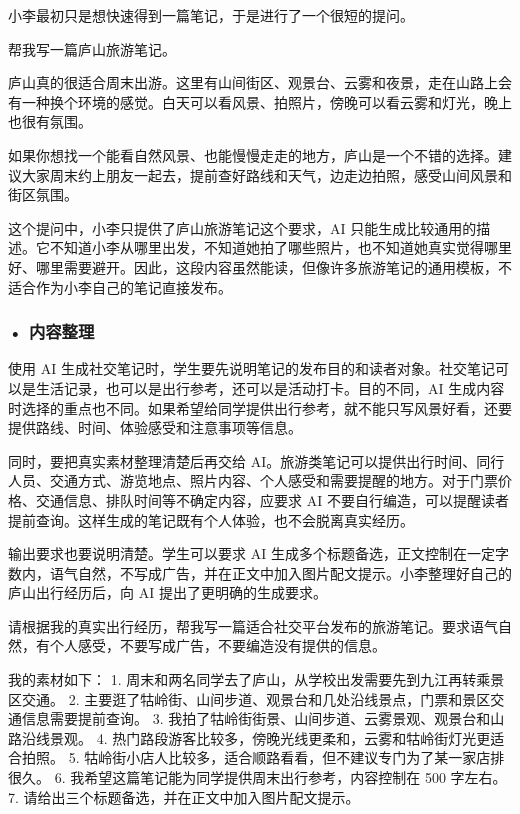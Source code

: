 小李最初只是想快速得到一篇笔记，于是进行了一个很短的提问。

\begin{userbox}
帮我写一篇庐山旅游笔记。
\end{userbox}

\begin{aibox}
庐山真的很适合周末出游。这里有山间街区、观景台、云雾和夜景，走在山路上会有一种换个环境的感觉。白天可以看风景、拍照片，傍晚可以看云雾和灯光，晚上也很有氛围。

如果你想找一个能看自然风景、也能慢慢走走的地方，庐山是一个不错的选择。建议大家周末约上朋友一起去，提前查好路线和天气，边走边拍照，感受山间风景和街区氛围。
\end{aibox}

这个提问中，小李只提供了庐山旅游笔记这个要求，AI 只能生成比较通用的描述。它不知道小李从哪里出发，不知道她拍了哪些照片，也不知道她真实觉得哪里好、哪里需要避开。因此，这段内容虽然能读，但像许多旅游笔记的通用模板，不适合作为小李自己的笔记直接发布。

\subsubsection*{\textbf{• 内容整理}}

使用 AI 生成社交笔记时，学生要先说明笔记的发布目的和读者对象。社交笔记可以是生活记录，也可以是出行参考，还可以是活动打卡。目的不同，AI 生成内容时选择的重点也不同。如果希望给同学提供出行参考，就不能只写风景好看，还要提供路线、时间、体验感受和注意事项等信息。

同时，要把真实素材整理清楚后再交给 AI。旅游类笔记可以提供出行时间、同行人员、交通方式、游览地点、照片内容、个人感受和需要提醒的地方。对于门票价格、交通信息、排队时间等不确定内容，应要求 AI 不要自行编造，可以提醒读者提前查询。这样生成的笔记既有个人体验，也不会脱离真实经历。

输出要求也要说明清楚。学生可以要求 AI 生成多个标题备选，正文控制在一定字数内，语气自然，不写成广告，并在正文中加入图片配文提示。小李整理好自己的庐山出行经历后，向 AI 提出了更明确的生成要求。


\begin{userbox}
请根据我的真实出行经历，帮我写一篇适合社交平台发布的旅游笔记。要求语气自然，有个人感受，不要写成广告，不要编造没有提供的信息。

我的素材如下：
1. 周末和两名同学去了庐山，从学校出发需要先到九江再转乘景区交通。
2. 主要逛了牯岭街、山间步道、观景台和几处沿线景点，门票和景区交通信息需要提前查询。
3. 我拍了牯岭街街景、山间步道、云雾景观、观景台和山路沿线景观。
4. 热门路段游客比较多，傍晚光线更柔和，云雾和牯岭街灯光更适合拍照。
5. 牯岭街小店人比较多，适合顺路看看，但不建议专门为了某一家店排很久。
6. 我希望这篇笔记能为同学提供周末出行参考，内容控制在 500 字左右。
7. 请给出三个标题备选，并在正文中加入图片配文提示。
\end{userbox}

